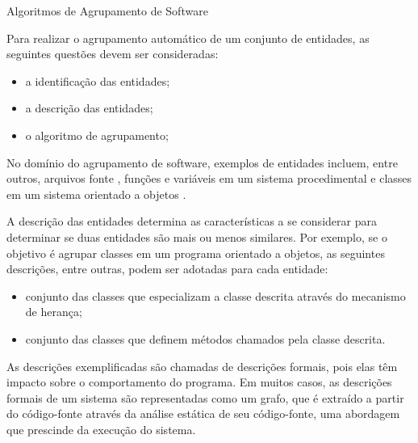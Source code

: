 \begin{section}{Algoritmos de Agrupamento de Software}

Para realizar o agrupamento automático de um conjunto de entidades, as seguintes questões devem ser consideradas:

\begin{itemize}
	\item a identificação das entidades;
	\item a descrição das entidades;
	\item o algoritmo de agrupamento;
\end{itemize}

No domínio do agrupamento de software, exemplos de entidades incluem, entre outros, arquivos fonte \cite{Mancoridis1998}, funções e variáveis em um sistema procedimental \cite{Anquetil1999} e classes em um sistema orientado a objetos \cite{Trifu2001}.

A descrição das entidades determina as características a se considerar para determinar se duas entidades são mais ou menos similares. Por exemplo, se o objetivo é agrupar classes em um programa orientado a objetos, as seguintes descrições, entre outras, podem ser adotadas para cada entidade:

\begin{itemize}
	\item conjunto das classes que especializam a classe descrita através do mecanismo de herança;
	\item conjunto das classes que definem métodos chamados pela classe descrita.
\end{itemize}

As descrições exemplificadas são chamadas de descrições formais, pois elas têm impacto sobre o comportamento do programa. Em muitos casos, as descrições formais de um sistema são representadas como um grafo, que é extraído a partir do código-fonte através da análise estática de seu código-fonte, uma abordagem que prescinde da execução do sistema.


\end{section}
